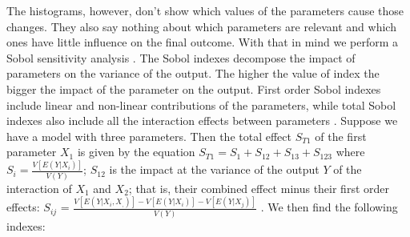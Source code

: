 \documentclass{article}
\begin{document}
    The histograms, however, don't show which values of the parameters cause
    those changes. They also say nothing about which parameters are relevant and
    which ones have little influence on the final outcome. With that in mind we
    perform a Sobol sensitivity analysis \cite{saltelli2000sensitivity}. The
    Sobol indexes decompose the impact of parameters on the variance of the
    output. The higher the value of index the bigger the impact of the parameter
    on the output. First order Sobol indexes include linear and non-linear
    contributions of the parameters, while total Sobol indexes also include all
    the interaction effects between parameters
    \cite{ten2016sensitivity}. Suppose we have a model with three parameters.
    Then the total effect  \(S_{T1}\) of the first parameter \(X_1\) is given by
    the equation \(S_{T1} = S_1 + S_{12} + S_{13} + S_{123}\) where \(S_i =
    \frac{V[E(Y|X_i)]}{V(Y)}\); \(S_{12}\) is the impact at the variance of the
    output \(Y\) of the interaction of \(X_{1}\) and \(X_{2}\); that is, their
    combined effect minus their first order effects:  \(S_{ij}\) =
    \(\frac{V[E(Y|X_i,X_,)] - V[E(Y|X_i)] - V[E(Y|X_j)]}{V(Y)} \) \cite{saltelli2008global}.
    We then find the following indexes:
\end{document}
